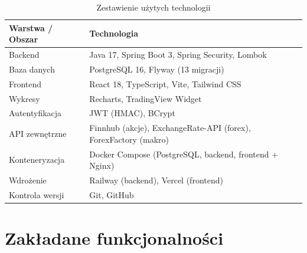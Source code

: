 \documentclass[12pt,a4paper]{article}
\begin{document}
\begin{table}[H]
\centering
\begin{tabular}{|l|l|}
\hline
\textbf{Warstwa / Obszar} & \textbf{Technologia} \\ \hline
Backend & Java 17, Spring Boot 3, Spring Security, Lombok \\ \hline
Baza danych & PostgreSQL 16, Flyway (13 migracji) \\ \hline
Frontend & React 18, TypeScript, Vite, Tailwind CSS \\ \hline
Wykresy & Recharts, TradingView Widget \\ \hline
Autentyfikacja & JWT (HMAC), BCrypt \\ \hline
API zewnętrzne & Finnhub (akcje), ExchangeRate-API (forex), ForexFactory (makro) \\ \hline
Konteneryzacja & Docker Compose (PostgreSQL, backend, frontend + Nginx) \\ \hline
Wdrożenie & Railway (backend), Vercel (frontend) \\ \hline
Kontrola wersji & Git, GitHub \\ \hline
\end{tabular}
\caption{Zestawienie użytych technologii}
\end{table}

\section{Zakładane funkcjonalności}
\end{document}
